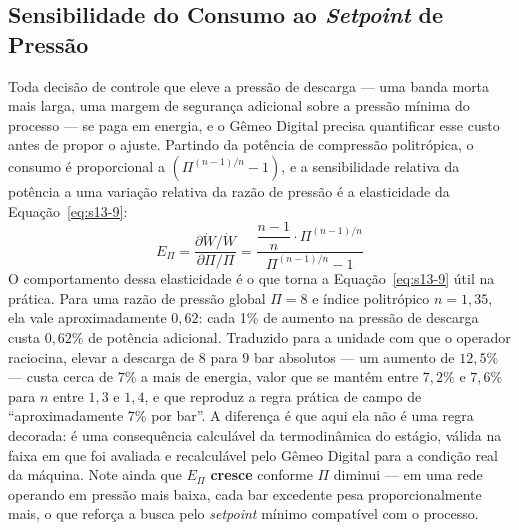 \documentclass[12pt,a4paper]{article}
\numberwithin{equation}{section}
\numberwithin{table}{section}
\numberwithin{figure}{section}
\begin{document}
{	\subsection{\textbf{Sensibilidade do Consumo ao \textit{Setpoint} de Pressão}}
	Toda decisão de controle que eleve a pressão de descarga — uma banda morta mais larga, uma margem de segurança adicional sobre a pressão mínima do processo — se paga em energia, e o Gêmeo Digital precisa quantificar esse custo antes de propor o ajuste. Partindo da potência de compressão politrópica, o consumo é proporcional a $\left(\Pi^{(n-1)/n} - 1\right)$, e a sensibilidade relativa da potência a uma variação relativa da razão de pressão é a elasticidade da Equação~\eqref{eq:s13-9}:
	\begin{equation}\label{eq:s13-9}
	E_{\Pi} = \frac{\partial \dot{W}/\dot{W}}{\partial \Pi/\Pi} = \frac{\dfrac{n-1}{n} \cdot \Pi^{(n-1)/n}}{\Pi^{(n-1)/n} - 1}
	\end{equation}
	O comportamento dessa elasticidade é o que torna a Equação~\eqref{eq:s13-9} útil na prática. Para uma razão de pressão global $\Pi = 8$ e índice politrópico $n = 1{,}35$, ela vale aproximadamente $0{,}62$: cada 1\% de aumento na pressão de descarga custa $0{,}62\%$ de potência adicional. Traduzido para a unidade com que o operador raciocina, elevar a descarga de $8$ para $9$ bar absolutos — um aumento de $12{,}5\%$ — custa cerca de $7\%$ a mais de energia, valor que se mantém entre $7{,}2\%$ e $7{,}6\%$ para $n$ entre $1{,}3$ e $1{,}4$, e que reproduz a regra prática de campo de ``aproximadamente 7\% por bar''. A diferença é que aqui ela não é uma regra decorada: é uma consequência calculável da termodinâmica do estágio, válida na faixa em que foi avaliada e recalculável pelo Gêmeo Digital para a condição real da máquina. Note ainda que $E_{\Pi}$ \textbf{cresce} conforme $\Pi$ diminui — em uma rede operando em pressão mais baixa, cada bar excedente pesa proporcionalmente mais, o que reforça a busca pelo \textit{setpoint} mínimo compatível com o processo.

}
\end{document}
